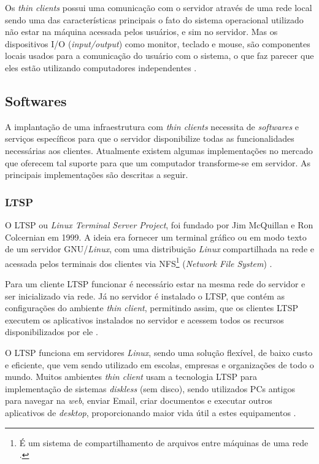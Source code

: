 \documentclass[
	12pt,				%
	openright,			%
	twoside,			%
	a4paper,			%
	chapter=TITLE,		%
	english,			%
	brazil				%
	]{abntex2}
\begin{document}
Os \textit{thin clients} possui uma comunicação com o servidor através de uma rede local sendo uma das características principais o fato do sistema operacional utilizado não estar na máquina acessada pelos usuários, e sim no servidor. Mas os dispositivos I/O (\textit{input/output}) como monitor, teclado e mouse, são componentes locais usados para a comunicação do usuário com o sistema, o que faz parecer que eles estão utilizando computadores independentes \cite{richards2007linux, ComoFuncionaThinClient}.


\subsection{Softwares}

A implantação de uma infraestrutura com \textit{thin clients} necessita de \textit{softwares} e serviços específicos para que o servidor disponibilize todas as funcionalidades necessárias aos clientes. Atualmente existem algumas implementações no mercado que oferecem tal suporte para que um computador transforme-se em servidor. As principais implementações são descritas a seguir.


\subsubsection{LTSP}

O LTSP ou \textit{Linux Terminal Server Project}, foi fundado por Jim McQuillan e Ron Colcernian em 1999. A ideia era fornecer um terminal gráfico ou em modo texto de um servidor GNU/\textit{Linux}, com uma distribuição \textit{Linux} compartilhada na rede e acessada pelos terminais dos clientes via NFS\footnote{É um sistema de compartilhamento de arquivos entre máquinas de uma rede \cite{nfs}.} (\textit{Network File System}) \cite{piaui}. 

Para um cliente LTSP funcionar é necessário estar na mesma rede do servidor e ser inicializado via rede.  Já no servidor é instalado o LTSP, que contém as configurações do ambiente \textit{thin client}, permitindo assim, que os clientes LTSP executem os aplicativos instalados no servidor e acessem todos os recursos disponibilizados por ele \cite{piaui}.

O LTSP funciona em servidores \textit{Linux}, sendo uma solução flexível, de baixo custo e eficiente, que vem sendo utilizado em escolas, empresas e organizações de todo o mundo. Muitos ambientes \textit{thin client} usam a tecnologia LTSP para implementação de sistemas \textit{diskless} (sem disco), sendo utilizados PCs antigos para navegar na \textit{web}, enviar Email, criar documentos e executar outros aplicativos de \textit{desktop}, proporcionando maior vida útil a estes equipamentos \cite{piaui,ltsp}.
\end{document}
